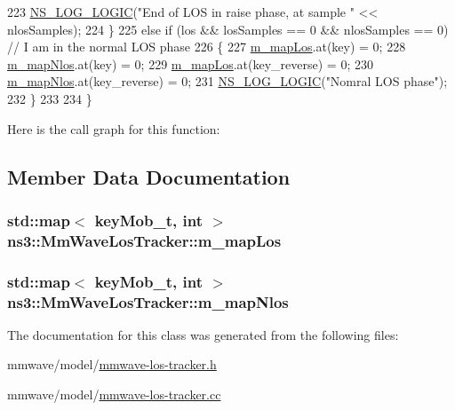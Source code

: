 \begin{DoxyCode}
223                 \hyperlink{group__logging_ga88acd260151caf2db9c0fc84997f45ce}{NS\_LOG\_LOGIC}(\textcolor{stringliteral}{"End of LOS in raise phase, at sample "} << nlosSamples);
224         \}
225         \textcolor{keywordflow}{else} \textcolor{keywordflow}{if} (los && losSamples == 0 && nlosSamples == 0) \textcolor{comment}{// I am in the normal LOS phase}
226         \{
227                 \hyperlink{classns3_1_1MmWaveLosTracker_a1ccd3a19ade5ca4b1e94bd113c593cd3}{m\_mapLos}.at(key) = 0;
228                 \hyperlink{classns3_1_1MmWaveLosTracker_ab8a492fa8798f2f775de311a6e619b19}{m\_mapNlos}.at(key) = 0;
229                 \hyperlink{classns3_1_1MmWaveLosTracker_a1ccd3a19ade5ca4b1e94bd113c593cd3}{m\_mapLos}.at(key\_reverse) = 0;
230                 \hyperlink{classns3_1_1MmWaveLosTracker_ab8a492fa8798f2f775de311a6e619b19}{m\_mapNlos}.at(key\_reverse) = 0;
231                 \hyperlink{group__logging_ga88acd260151caf2db9c0fc84997f45ce}{NS\_LOG\_LOGIC}(\textcolor{stringliteral}{"Nomral LOS phase"});
232         \}
233 
234 \}
\end{DoxyCode}


Here is the call graph for this function\+:




\subsection{Member Data Documentation}
\subsubsection[{\texorpdfstring{m\+\_\+map\+Los}{m_mapLos}}]{\setlength{\rightskip}{0pt plus 5cm}std\+::map$<$ {\bf key\+Mob\+\_\+t}, int $>$ ns3\+::\+Mm\+Wave\+Los\+Tracker\+::m\+\_\+map\+Los\hspace{0.3cm}{\ttfamily [private]}}\hypertarget{classns3_1_1MmWaveLosTracker_a1ccd3a19ade5ca4b1e94bd113c593cd3}{}\label{classns3_1_1MmWaveLosTracker_a1ccd3a19ade5ca4b1e94bd113c593cd3}
\subsubsection[{\texorpdfstring{m\+\_\+map\+Nlos}{m_mapNlos}}]{\setlength{\rightskip}{0pt plus 5cm}std\+::map$<$ {\bf key\+Mob\+\_\+t}, int $>$ ns3\+::\+Mm\+Wave\+Los\+Tracker\+::m\+\_\+map\+Nlos\hspace{0.3cm}{\ttfamily [private]}}\hypertarget{classns3_1_1MmWaveLosTracker_ab8a492fa8798f2f775de311a6e619b19}{}\label{classns3_1_1MmWaveLosTracker_ab8a492fa8798f2f775de311a6e619b19}


The documentation for this class was generated from the following files\+:\begin{DoxyCompactItemize}
\item 
mmwave/model/\hyperlink{mmwave-los-tracker_8h}{mmwave-\/los-\/tracker.\+h}\item 
mmwave/model/\hyperlink{mmwave-los-tracker_8cc}{mmwave-\/los-\/tracker.\+cc}\end{DoxyCompactItemize}
